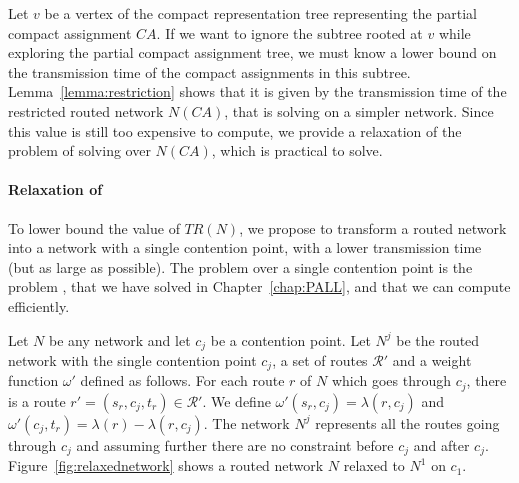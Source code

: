 Let $v$ be a vertex of the compact representation tree representing the partial compact assignment $CA$.
If we want to ignore the subtree rooted at $v$ while exploring the partial compact assignment tree,
we must know a lower bound on the transmission time of the compact assignments in this subtree.
Lemma~\ref{lemma:restriction} shows that it is given by the transmission time of the restricted routed network
$N(CA)$, that is solving \minstra on a simpler network. Since this value is still too expensive to compute, we provide a relaxation of the problem of solving \minstra over $N(CA)$, which is practical to solve.

\paragraph{Relaxation of \minstra}

To lower bound the value of $TR(N)$, we propose to transform a routed network into a network with a single contention point, with a lower transmission time (but as large as possible). The problem \minstra over a single contention point is the problem \wta, that we have solved in Chapter~\ref{chap:PALL}, and that we can compute efficiently.

Let $N$ be any network and let $c_j$ be a contention point. Let $N^j$ be the routed network with the
single contention point $c_j$, a set of routes $\mathcal{R}'$ and a weight function $\omega'$ defined as follows. For each route $r$ of $N$ which goes through $c_j$, there is a route $r' = (s_r,c_j,t_r) \in \mathcal{R}'$. We define $\omega'(s_r,c_j) = \lambda(r,c_j)$ and $\omega'(c_j,t_r) =  \lambda(r) - \lambda(r,c_j)$. The network $N^j$ represents all the routes going through $c_j$ and assuming further there are no constraint before $c_j$ and after $c_j$.   
Figure~\ref{fig:relaxednetwork} shows a routed network $N$ relaxed to $N^1$ on $c_1$.

